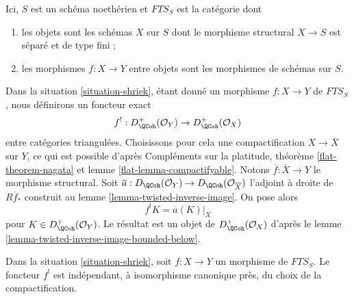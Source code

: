 \begin{situation}
\label{situation-shriek}
Ici, $S$ est un schéma noethérien et $\textit{FTS}_S$ est la catégorie dont
\begin{enumerate}
\item les objets sont les schémas $X$ sur $S$ dont le morphisme structural $X \to S$ est séparé et de type fini ;
\item les morphismes $f : X \to Y$ entre objets sont les morphismes de schémas sur $S$.
\end{enumerate}
\end{situation}

\noindent
Dans la situation \ref{situation-shriek}, étant donné un morphisme $f : X \to Y$ de $\textit{FTS}_S$, nous définirons un foncteur exact
$$
f^! : D_\QCoh^+(\mathcal{O}_Y) \to D_\QCoh^+(\mathcal{O}_X)
$$
entre catégories triangulées. Choisissons pour cela une compactification $X \to \overline{X}$ sur $Y$, ce qui est possible d'après Compléments sur la platitude, théorème \ref{flat-theorem-nagata} et lemme \ref{flat-lemma-compactifyable}. Notons $\overline{f} : \overline{X} \to Y$ le morphisme structural. Soit
$\overline{a} : D_\QCoh(\mathcal{O}_Y) \to D_\QCoh(\mathcal{O}_{\overline{X}})$
l'adjoint à droite de $R\overline{f}_*$ construit au lemme \ref{lemma-twisted-inverse-image}. On pose alors
$$
f^!K  = \overline{a}(K)|_X
$$
pour $K \in D_\QCoh^+(\mathcal{O}_Y)$. Le résultat est un objet de $D_\QCoh^+(\mathcal{O}_X)$ d'après le lemme \ref{lemma-twisted-inverse-image-bounded-below}.

\begin{lemma}
\label{lemma-shriek-well-defined}
Dans la situation \ref{situation-shriek}, soit $f : X \to Y$ un morphisme de $\textit{FTS}_S$. Le foncteur $f^!$ est indépendant, à isomorphisme canonique près, du choix de la compactification.
\end{lemma}

